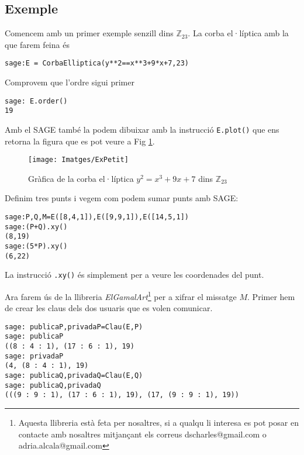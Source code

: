 \documentclass[journal]{IEEEtran}
\begin{document}
\subsection{Exemple}
Comencem amb un primer exemple senzill dins $\mathbb{Z}_{23}$. La corba el·líptica amb la que farem feina és
\begin{scriptsize}
\begin{verbatim}
sage:E = CorbaElliptica(y**2==x**3+9*x+7,23)
\end{verbatim}
\end{scriptsize}
Comprovem que l'ordre sigui primer
\begin{scriptsize}
\begin{verbatim}
sage: E.order()
19
\end{verbatim}
\end{scriptsize}
Amb el SAGE també la podem dibuixar amb la instrucció \texttt{E.plot()} que ens retorna la figura que es pot veure a Fig \ref{Expetit}.
\begin{figure}
\texttt{[image: Imatges/ExPetit]}
\caption{Gràfica de la corba el·líptica $y^2=x^3+ 9x+7$ dins $\mathbb{Z}_{23}$}\label{Expetit}
\end{figure}

Definim tres punts i vegem com podem sumar punts amb SAGE:
\begin{scriptsize}
\begin{verbatim}
sage:P,Q,M=E([8,4,1]),E([9,9,1]),E([14,5,1])
sage:(P+Q).xy()
(8,19)
sage:(5*P).xy()
(6,22)
\end{verbatim}
\end{scriptsize}
La instrucció \texttt{.xy()} és simplement per a veure les coordenades del punt.

Ara farem ús de la llibreria \emph{ElGamalArt}\footnote{Aquesta llibreria està feta per nosaltres, si a qualqu li interesa es pot posar en contacte amb nosaltres mitjançant els correus dscharles@gmail.com o adria.alcala@gmail.com} per a xifrar el missatge $M$. Primer hem de crear les claus dels dos usuaris que es volen comunicar.
\begin{scriptsize}
\begin{verbatim}
sage: publicaP,privadaP=Clau(E,P)
sage: publicaP
((8 : 4 : 1), (17 : 6 : 1), 19)
sage: privadaP
(4, (8 : 4 : 1), 19)
sage: publicaQ,privadaQ=Clau(E,Q)
sage: publicaQ,privadaQ
(((9 : 9 : 1), (17 : 6 : 1), 19), (17, (9 : 9 : 1), 19))
\end{verbatim}
\end{scriptsize}
\end{document}
